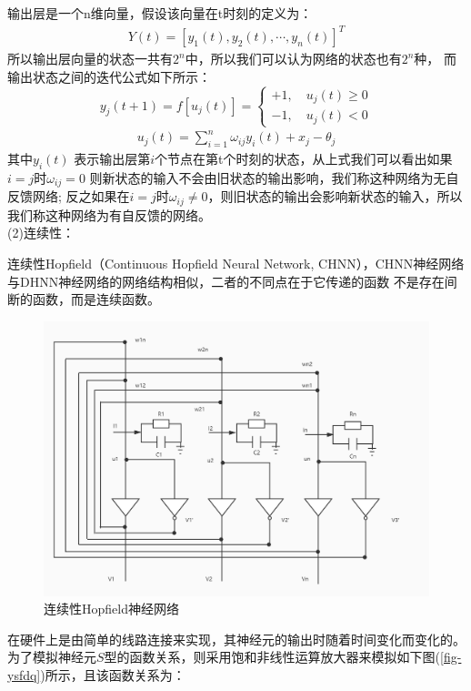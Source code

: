 输出层是一个n维向量，假设该向量在t时刻的定义为：
\begin{align}
    Y(t) = [y_1(t), y_2(t), \cdots, y_n(t)]^T
\end{align}
所以输出层向量的状态一共有$2^n$中，所以我们可以认为网络的状态也有$2^n$种，
而输出状态之间的迭代公式如下所示：
\begin{equation}
y_j(t+1)=f[u_j(t)]=
    \begin{cases} 
        +1,\quad u_j(t) \ge 0 \\
        -1,\quad u_j(t) < 0 
    \end{cases}
    \label{scdd}%
\end{equation}
\begin{align}
    u_j(t) = \sum_{i=1}^n \omega_{ij} y_i(t) + x_j - \theta_j \label{srdd} %
\end{align}
其中$y_i(t)$ 表示输出层第$i$个节点在第t个时刻的状态，从上式我们可以看出如果$i=j$时$\omega_{ij} = 0$ 则新状态的输入不会由旧状态的输出影响，我们称这种网络为无自反馈网络;
反之如果在$i =j $时$\omega_{ij} \ne 0$，则旧状态的输出会影响新状态的输入，所以我们称这种网络为有自反馈的网络。\\
(2)连续性：
\par
连续性Hopfield（Continuous Hopfield Neural Network, CHNN），CHNN神经网络与DHNN神经网络的网络结构相似，二者的不同点在于它传递的函数
不是存在间断的函数，而是连续函数。
\begin{figure}[htbp]
    \centering
    \includegraphics[width=13cm]{figure/CHNN.jpg}
    \caption{连续性Hopfield神经网络}
    \label{fig-CHNN}
\end{figure}
在硬件上是由简单的线路连接来实现，其神经元的输出时随着时间变化而变化的。为了模拟神经元$S$型的函数关系，则采用饱和非线性运算放大器来模拟如下图(\ref{fig-ysfdq})所示，且该函数关系为：
